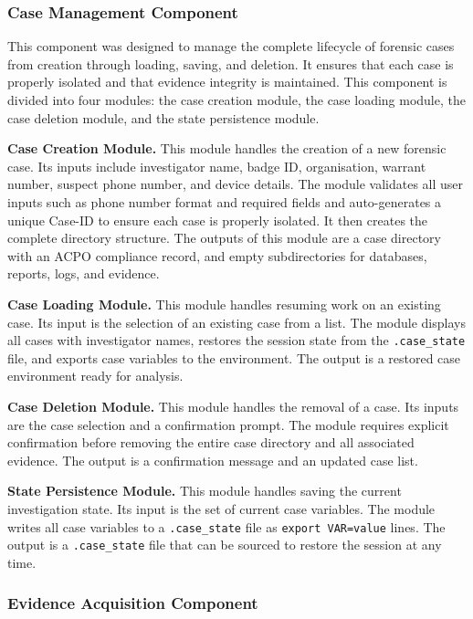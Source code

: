 \documentclass[12pt,a4paper]{report}
\begin{document}
\subsubsection{Case Management Component}

This component was designed to manage the complete lifecycle of forensic cases from creation through loading, saving, and deletion. It ensures that each case is properly isolated and that evidence integrity is maintained. This component is divided into four modules: the case creation module, the case loading module, the case deletion module, and the state persistence module.

\textbf{Case Creation Module.} This module handles the creation of a new forensic case. Its inputs include investigator name, badge ID, organisation, warrant number, suspect phone number, and device details. The module validates all user inputs such as phone number format and required fields and auto-generates a unique Case-ID to ensure each case is properly isolated. It then creates the complete directory structure. The outputs of this module are a case directory with an ACPO compliance record, and empty subdirectories for databases, reports, logs, and evidence.

\textbf{Case Loading Module.} This module handles resuming work on an existing case. Its input is the selection of an existing case from a list. The module displays all cases with investigator names, restores the session state from the \texttt{.case\_state} file, and exports case variables to the environment. The output is a restored case environment ready for analysis.

\textbf{Case Deletion Module.} This module handles the removal of a case. Its inputs are the case selection and a confirmation prompt. The module requires explicit confirmation before removing the entire case directory and all associated evidence. The output is a confirmation message and an updated case list.

\textbf{State Persistence Module.} This module handles saving the current investigation state. Its input is the set of current case variables. The module writes all case variables to a \texttt{.case\_state} file as \texttt{export VAR=value} lines. The output is a \texttt{.case\_state} file that can be sourced to restore the session at any time.

\subsubsection{Evidence Acquisition Component}
\end{document}
